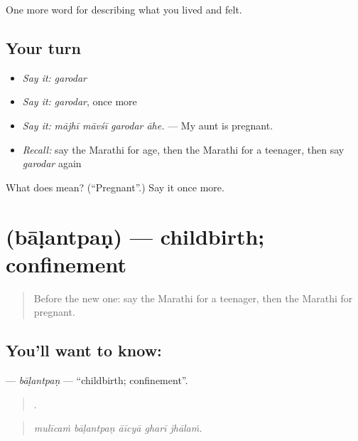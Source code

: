 \begin{grammarlens}[title={What you've built}]
One more word for describing what you lived and felt.
\end{grammarlens}

\subsection*{Your turn}
\begin{itemize}
\raggedright
  \item \emph{Say it:} \emph{garodar}
  \item \emph{Say it:} \emph{garodar}, once more
  \item \emph{Say it:} \emph{mājhī māvśī garodar āhe.} — My aunt is pregnant.
  \item \emph{Recall:} say the Marathi for age, then the Marathi for a teenager, then say \emph{garodar} again
\end{itemize}

\begin{tcolorbox}[breakable,colback=teal!4,colframe=teal!35!black,title={Before you move on}]
What does  mean? (\textquotedblleft{}Pregnant\textquotedblright{}.) Say it once more.
\end{tcolorbox}
\section[\texorpdfstring{\mr{बाळंतपण} (bāḷantpaṇ)}{बाळंतपण (bāḷantpaṇ)}]{ (bāḷantpaṇ) — childbirth; confinement}

\label{lesson:MR-C499-balantpan}



\begin{quote}
Before the new one: say the Marathi for a teenager, then the Marathi for pregnant.
\end{quote}

\subsection*{You'll want to know: }
\textbf{} — \emph{bāḷantpaṇ} — \textquotedblleft{}childbirth; confinement\textquotedblright{}.

\begin{quote}
    .
\end{quote}

\begin{quote}
\emph{mulīcaṁ bāḷantpaṇ āīcyā gharī jhālaṁ.}
\end{quote}

